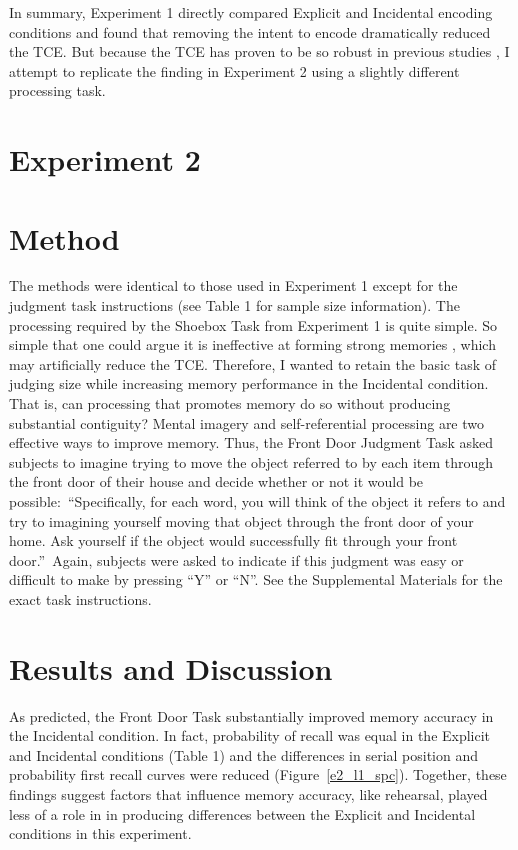 \documentclass[man,natbib,floatsintext]{apa6} %
\begin{document}
In summary, Experiment 1 directly compared Explicit and Incidental encoding conditions and found that removing the intent to encode dramatically reduced the TCE. \color{black} But because the TCE has proven to be so robust in previous studies \citep{HealKaha17}, I attempt to replicate the finding in Experiment 2 using a slightly different processing task.




\section{Experiment 2}
\section{Method}

The methods were identical to those used in Experiment 1 except for the judgment task instructions (see Table 1 for sample size information).
The processing required by the Shoebox Task from Experiment 1 is quite simple. So simple that one could argue it is  ineffective at forming strong memories \label{newcite}\citep{EaglLeit64}, which may artificially reduce the TCE. Therefore, I wanted to retain the basic task of judging size while increasing memory performance in the Incidental condition. That is, can processing that promotes memory do so without producing substantial contiguity? Mental imagery and self-referential processing are two effective ways to improve memory. Thus, the Front Door Judgment Task asked subjects to imagine trying to move the object referred to by each item through the front door of their house and decide whether or not it would be possible:~\label{newinst}\color{red}``Specifically, for each word, you will think of the object it refers to and try to imagining yourself moving that object through the front door of your home. Ask yourself if the object would successfully fit through your front door.''\color{black}~Again, subjects were asked to indicate if this judgment was easy or difficult to make by pressing ``Y'' or ``N''. See the Supplemental Materials for the exact task instructions.

\section{Results and Discussion}
As predicted, the Front Door Task substantially improved memory accuracy in the Incidental condition. In fact, probability of recall was equal in the Explicit and Incidental conditions (Table 1) \color{red} and the differences in serial position and probability first recall curves were reduced (Figure~\ref{e2_l1_spc}). Together, these findings suggest factors that influence memory accuracy, like rehearsal, played less of a role in in producing differences between the Explicit and Incidental conditions in this experiment.
\end{document}
